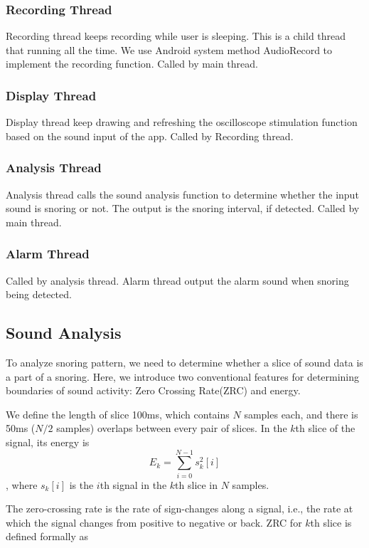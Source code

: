 \documentclass[conference]{IEEEtran}
\begin{document}
\subsubsection{Recording Thread}
Recording thread keeps recording while user is sleeping. This is a child thread that running all the time. We use Android system method AudioRecord to implement the recording function. Called by main thread. 

\subsubsection{Display Thread}
Display thread keep drawing and refreshing the oscilloscope stimulation function based on the sound input of the app. Called by Recording thread. 

\subsubsection{Analysis Thread}
Analysis thread calls the sound analysis function to determine whether the input sound is snoring or not.  The output is the snoring interval, if detected. Called by main thread. 

\subsubsection{Alarm Thread}
Called by analysis thread. Alarm thread output the alarm sound when snoring being detected.

\subsection{Sound Analysis} %
\label{sub:sound_analysis}

To analyze snoring pattern, we need to determine whether a slice of sound data is a part of a snoring.   Here, we introduce two conventional features for determining boundaries of sound activity: Zero Crossing Rate(ZRC) and energy. 

We define the length of slice 100ms, which contains $N$ samples each, and there is 50ms ($N/2$ samples) overlaps between every pair of slices. In the $k$th slice of the signal, its energy is $$E_k=\sum_{i=0}^{N-1}s^2_k[i]$$, where $s_k[i]$ is the $i$th signal in the $k$th slice in $N$ samples. 

The zero-crossing rate is the rate of sign-changes along a signal, i.e., the rate at which the signal changes from positive to negative or back. ZRC for $k$th slice is defined formally as
\end{document}

